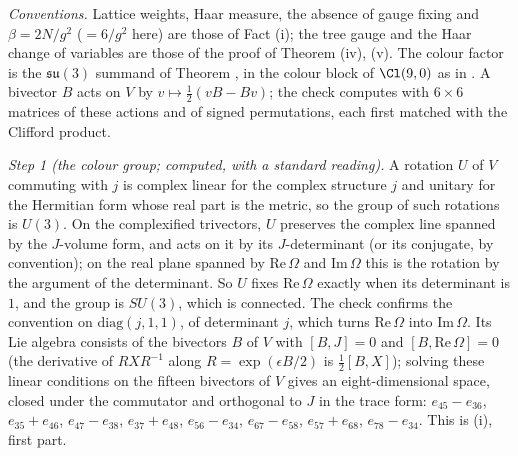 \emph{Conventions.} Lattice weights, Haar measure, the absence of gauge fixing and $\beta = 2N/g^{2}$ ($= 6/g^{2}$ here) are those of Fact (i); the tree gauge and the Haar change of variables are those of the proof of Theorem (iv), (v). The colour factor is the $\mathfrak{su}(3)$ summand of Theorem , in the colour block of $\Cl(9,0)$ as in . A bivector $B$ acts on $V$ by $v \mapsto \tfrac12(vB - Bv)$; the check computes with $6 \times 6$ matrices of these actions and of signed permutations, each first matched with the Clifford product.

\emph{Step 1 (the colour group; computed, with a standard reading).} A rotation $U$ of $V$ commuting with $j$ is complex linear for the complex structure $j$ and unitary for the Hermitian form whose real part is the metric, so the group of such rotations is $U(3)$. On the complexified trivectors, $U$ preserves the complex line spanned by the $J$-volume form, and acts on it by its $J$-determinant (or its conjugate, by convention); on the real plane spanned by $\mathrm{Re}\,\Omega$ and $\mathrm{Im}\,\Omega$ this is the rotation by the argument of the determinant. So $U$ fixes $\mathrm{Re}\,\Omega$ exactly when its determinant is $1$, and the group is $SU(3)$, which is connected. The check confirms the convention on $\mathrm{diag}(j, 1, 1)$, of determinant $j$, which turns $\mathrm{Re}\,\Omega$ into $\mathrm{Im}\,\Omega$. Its Lie algebra consists of the bivectors $B$ of $V$ with $[B, J] = 0$ and $[B, \mathrm{Re}\,\Omega] = 0$ (the derivative of $RXR^{-1}$ along $R = \exp(\epsilon B/2)$ is $\tfrac12[B, X]$); solving these linear conditions on the fifteen bivectors of $V$ gives an eight-dimensional space, closed under the commutator and orthogonal to $J$ in the trace form: $e_{45} - e_{36}$, $e_{35} + e_{46}$, $e_{47} - e_{38}$, $e_{37} + e_{48}$, $e_{56} - e_{34}$, $e_{67} - e_{58}$, $e_{57} + e_{68}$, $e_{78} - e_{34}$. This is (i), first part.

